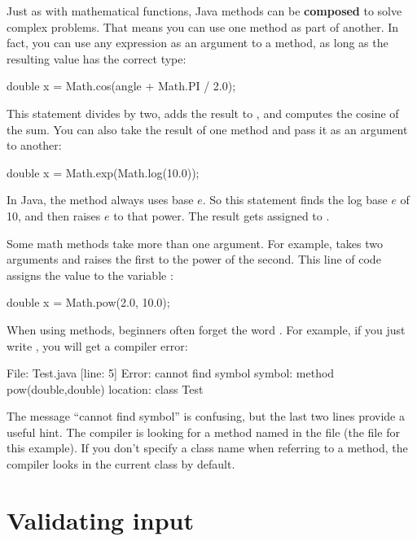 
Just as with mathematical functions, Java methods can be {\bf composed} to solve complex problems.
That means you can use one method as part of another.
In fact, you can use any expression as an argument to a method, as long as the resulting value has the correct type:

\begin{code}
double x = Math.cos(angle + Math.PI / 2.0);
\end{code}

This statement divides  by two, adds the result to , and computes the cosine of the sum.
You can also take the result of one method and pass it as an argument to another:

\begin{code}
double x = Math.exp(Math.log(10.0));
\end{code}

In Java, the  method always uses base $e$.
So this statement finds the log base $e$ of 10, and then raises $e$ to that power.
The result gets assigned to .

Some math methods take more than one argument.
For example,  takes two arguments and raises the first to the power of the second.
This line of code assigns the value  to the variable :

\begin{code}
double x = Math.pow(2.0, 10.0);
\end{code}

When using  methods, beginners often forget the word .
For example, if you just write , you will get a compiler error:

\begin{stdout}
File: Test.java  [line: 5]
Error: cannot find symbol
  symbol:   method pow(double,double)
  location: class Test
\end{stdout}

The message ``cannot find symbol'' is confusing, but the last two lines provide a useful hint.
The compiler is looking for a method named  in the file  (the file for this example).
If you don't specify a class name when referring to a method, the compiler looks in the current class by default.


\section{Validating input}
\label{validate}

